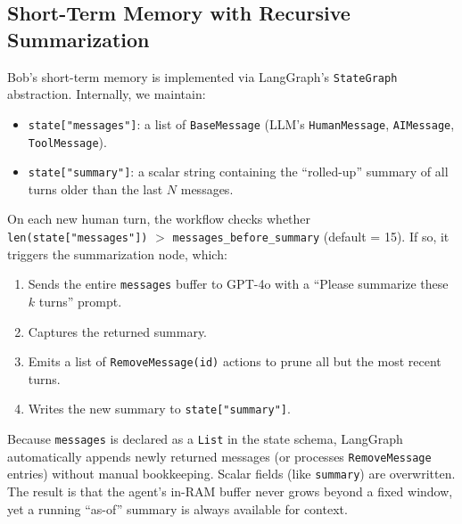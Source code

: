 \documentclass[11pt]{article}
\begin{document}
\subsection{Short-Term Memory with Recursive Summarization}
Bob’s short-term memory is implemented via LangGraph’s \texttt{StateGraph} abstraction. Internally, we maintain:
\begin{itemize}[leftmargin=*]
  \item \texttt{state["messages"]}: a list of \texttt{BaseMessage} (LLM’s \texttt{HumanMessage}, \texttt{AIMessage}, \texttt{ToolMessage}).
  \item \texttt{state["summary"]}: a scalar string containing the “rolled-up” summary of all turns older than the last $N$ messages.
\end{itemize}

On each new human turn, the workflow checks whether \\
 \texttt{len(state["messages"])} $>$ \texttt{messages\_before\_summary} (default = 15). 
If so, it triggers the summarization node, which:
\begin{enumerate}[leftmargin=*]
  \item Sends the entire \texttt{messages} buffer to GPT-4o with a “Please summarize these $k$ turns” prompt.
  \item Captures the returned summary.
  \item Emits a list of \texttt{RemoveMessage(id)} actions to prune all but the most recent turns.
  \item Writes the new summary to \texttt{state["summary"]}.
\end{enumerate}

Because \texttt{messages} is declared as a \texttt{List} in the state schema, 
LangGraph automatically appends newly returned messages 
(or processes \texttt{RemoveMessage} entries) without manual bookkeeping. 
Scalar fields (like \texttt{summary}) are overwritten. 
The result is that the agent’s in-RAM buffer never grows beyond a 
fixed window, yet a running “as-of” summary is always available for context.
\end{document}
